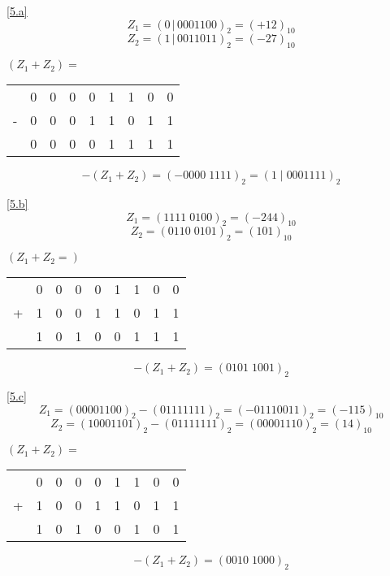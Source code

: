 \documentclass[a4paper, margins=3cm, newpage]{homework}
\begin{document}
\begin{solution}
	\ref{5.a}
	\[ Z_1 = (0\,|\, 0001100)_2 = (+12)_{10} \]
	\[ Z_2 = (1\,|\, 0011011)_2 = (-27)_{10} \]
	\begin{center}
		$(Z_1 + Z_2) = $
		\begin{tabular}{c@{\,}c@{\,}c@{\,}c@{\,}c@{\,}c@{\,}c@{\,}c@{\,}c@{\,}}
		  & 0 & 0 & 0 & 0 & 1 & 1 & 0 & 0 \\
		- & 0 & 0 & 0 & 1 & 1 & 0 & 1 & 1 \\ \hline
		  & 0 & 0 & 0 & 0 & 1 & 1 & 1 & 1
		\end{tabular}
	\end{center}
	\[-(Z_1+Z_2) = (-0000\;1111)_2 = (1\;|\; 0001111)_2\]

	\ref{5.b}
	\[Z_1 = (1111\;0100)_2 = (-244)_{10}\]
	\[Z_2 = (0110\;0101)_2 = (101)_{10}\]
	\begin{center}
		\((Z_1+Z_2 = )\)
		\begin{tabular}{c@{\,}c@{\,}c@{\,}c@{\,}c@{\,}c@{\,}c@{\,}c@{\,}c@{\,}}
		  & 0 & 0 & 0 & 0 & 1 & 1 & 0 & 0 \\
		+ & 1 & 0 & 0 & 1 & 1 & 0 & 1 & 1 \\ \hline
		  & 1 & 0 & 1 & 0 & 0 & 1 & 1 & 1
		\end{tabular}
	\end{center}
	\[-(Z_1 + Z_2) = (0101\;1001)_2\]

	\ref{5.c}
	\[Z_1 = (00001100)_2 - (01111111)_2 = (-01110011)_2 = (-115)_{10}\]
	\[Z_2 = (10001101)_2 - (01111111)_2 = (00001110)_2 = (14)_{10}\]
	\begin{center}
		\((Z_1+Z_2)=\)
		\begin{tabular}{c@{\,}c@{\,}c@{\,}c@{\,}c@{\,}c@{\,}c@{\,}c@{\,}c@{\,}}
		  & 0 & 0 & 0 & 0 & 1 & 1 & 0 & 0 \\
		+ & 1 & 0 & 0 & 1 & 1 & 0 & 1 & 1 \\ \hline
		  & 1 & 0 & 1 & 0 & 0 & 1 & 0 & 1
		\end{tabular}
	\end{center}
	\[-(Z_1+Z_2)= (0010\;1000)_2\]
\end{solution}
\end{document}
